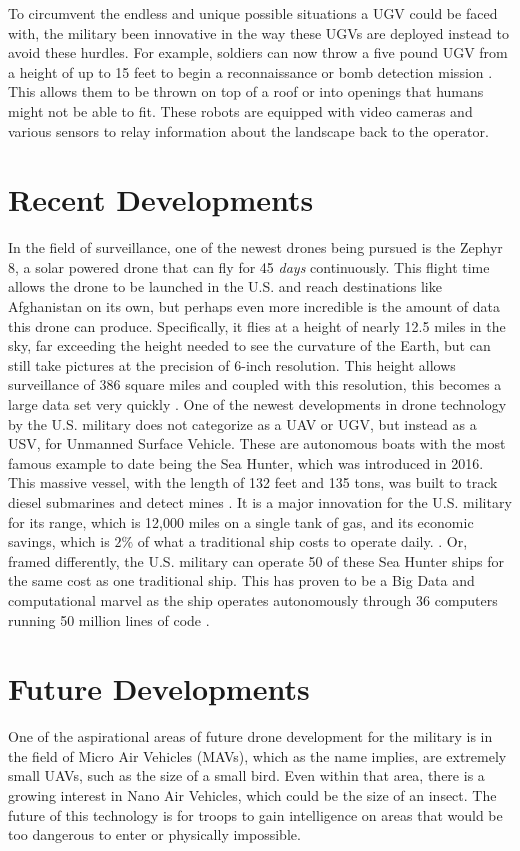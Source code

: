\documentclass[sigconf]{acmart}
\begin{document}
To circumvent the endless and unique possible situations a UGV could be faced with, the military been innovative in the way these UGVs are deployed instead to avoid these hurdles. For example, soldiers can now throw a five pound UGV from a height of up to 15 feet to begin a reconnaissance or bomb detection mission \cite{throwugv}. This allows them to be thrown on top of a roof or into openings that humans might not be able to fit. These robots are equipped with video cameras and various sensors to relay information about the landscape back to the operator.  

\section{Recent Developments}
In the field of surveillance, one of the newest drones being pursued is the Zephyr 8, a solar powered drone that can fly for 45 \emph{days} continuously. This flight time allows the drone to be launched in the U.S. and reach destinations like Afghanistan on its own, but perhaps even more incredible is the amount of data this drone can produce. Specifically, it flies at a height of nearly 12.5 miles in the sky, far exceeding the height needed to see the curvature of the Earth, but can still take pictures at the precision of 6-inch resolution. This height allows surveillance of 386 square miles and coupled with this resolution, this becomes a large data set very quickly \cite{foxdrone}. 
One of the newest developments in drone technology by the U.S. military does not categorize as a UAV or UGV, but instead as a USV, for Unmanned Surface Vehicle. These are autonomous boats with the most famous example to date being the Sea Hunter, which was introduced in 2016. This massive vessel, with the length of 132 feet and 135 tons, was built to track diesel submarines and detect mines \cite{seahunter}. It is a major innovation for the U.S. military for its range, which is 12,000 miles on a single tank of gas, and its economic savings, which is $2\%$ of what a traditional ship costs to operate daily. \cite{seahuntergas} \cite{seahuntercost}. Or, framed differently, the U.S. military can operate 50 of these Sea Hunter ships for the same cost as one traditional ship. This has proven to be a Big Data and computational marvel as the ship operates autonomously through 36 computers running 50 million lines of code \cite{60minutes}.

\section{Future Developments}
One of the aspirational areas of future drone development for the military is in the field of Micro Air Vehicles (MAVs), which as the name implies, are extremely small UAVs, such as the size of a small bird. Even within that area, there is a growing interest in Nano Air Vehicles, which could be the size of an insect. The future of this technology is for troops to gain intelligence on areas that would be too dangerous to enter or physically impossible. 
\end{document}
